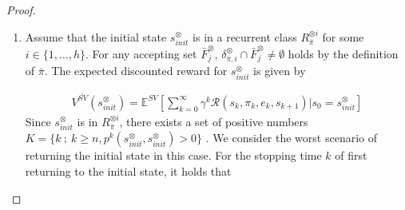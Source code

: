 \documentclass[10pt]{article}
\theoremstyle{definition}
\begin{document}
\begin{proof}
  \begin{enumerate}
    \vspace{2mm}
    \item Assume that the initial state $s^{\otimes}_{init}$ is in a recurrent class $R^{\otimes i}_{\bar{\pi}}$ for some $ i \in \{ 1,\ldots,h \} $.
    For any accepting set $\bar{F}^{\otimes}_j$, $\delta^{\otimes}_{\bar{\pi},i} \cap \bar{F}^{\otimes}_j \neq \emptyset$ holds by the definition of $\bar{\pi}$. The expected discounted reward for $s^{\otimes}_{init}$ is given by

  \begin{align}
    V^{\bar{SV}}(s^{\otimes}_{init}) = \mathbb{E}^{SV}[ {\sum_{k=0}^{\infty}} \gamma^k \mathcal{R}(s_k, \pi_k, e_k, s_{k+1}) | s_0 = s^{\otimes}_{init} ]
  \end{align}
    Since $s^{\otimes}_{init}$ is in $R^{\otimes i}_{\bar{\pi}}$, there exists a set of positive numbers $K = \{ k\ ;\ k \geq n, p^{k}(s^{\otimes}_{init}, s^{\otimes}_{init}) > 0 \}$ \cite{ESS}. We consider the worst scenario of returning the initial state in this case. For the stopping time $k$ of first returning to the initial state, it holds that


\end{enumerate}
\end{proof}
\end{document}
